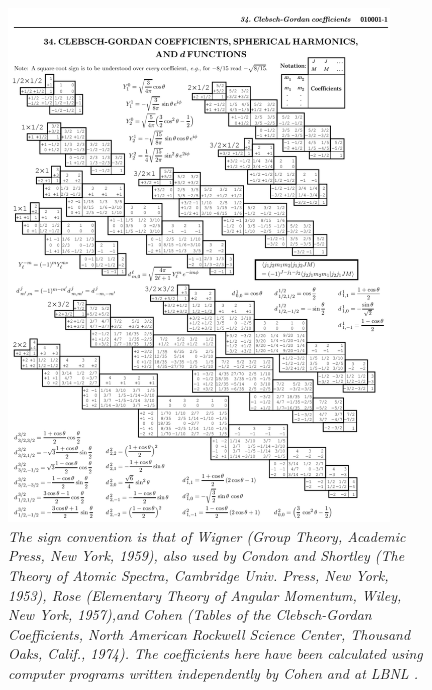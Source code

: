 \documentclass[11pt]{article}
\numberwithin{equation}{section}
\begin{document}
\begin{figure}[H]
\centering
\includegraphics[width=0.9\textwidth]{image.png}
\caption{\label{fig:2}\small \emph{The sign convention is that of Wigner (Group Theory, Academic Press, New York, 1959), also used by Condon and Shortley (The Theory of Atomic Spectra, Cambridge Univ. Press, New York, 1953), Rose (Elementary Theory of Angular Momentum, Wiley, New York, 1957),and Cohen (Tables of the Clebsch-Gordan Coefficients, North American Rockwell Science Center, Thousand Oaks, Calif., 1974). The coefficients here have been calculated using computer programs written independently by Cohen and at LBNL .}}
\end{figure}
\end{document}

